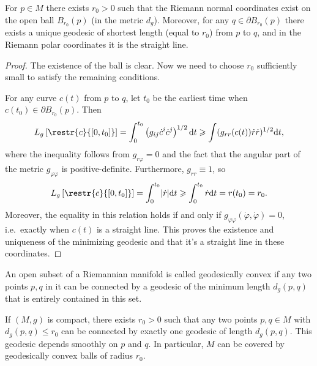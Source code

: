 \documentclass[english,letterpaper]{article}%
\numberwithin{equation}{section}
\numberwithin{figure}{section}
\numberwithin{table}{section}
\theoremstyle{definition}
\theoremstyle{definition}
\theoremstyle{definition}
\theoremstyle{plain}
\theoremstyle{plain}
\theoremstyle{plain}
\theoremstyle{plain}
\theoremstyle{remark}
\theoremstyle{remark}
\newcommand{\dd}{{\mathrm{d}}}
\renewcommand{\geq}{\geqslant}
\renewcommand{\leq}{\leqslant}
\begin{document}
\begin{cor}
    For $p\in M$ there exists $r_0>0$ such that the Riemann normal coordinates exist on the open ball $B_{r_0}(p)$ (in the metric $d_g$). Moreover, for any $q\in \partial B_{r_0}(p)$ there exists a unique geodesic of shortest length (equal to $r_0$) from $p$ to $q$, and in the Riemann polar coordinates it is the straight line.
\end{cor}
\begin{proof}
    The existence of the ball is clear. Now we need to choose $r_0$ sufficiently small to satisfy the remaining conditions.
    
    For any curve $c(t)$ from $p$ to $q$, let $t_0$ be the earliest time when $c(t_0)\in \partial B_{r_0}(p)$. Then
    \[L_g\left[\restr{c}{[0,t_0]}\right]=\int_0^{t_0} \left(g_{ij}\dot c^i\dot c^j\right)^{1/2}\dd t\geq \int (g_{rr}(c(t))\dot r\dot r)^{1/2}\dd t,\]
    where the inequality follows from $g_{r\varphi}=0$ and the fact that the angular part of the metric $g_{\varphi\varphi}$ is positive-definite. Furthermore, $g_{rr}\equiv1$, so
    \[L_g\left[\restr{c}{[0,t_0]}\right]=\int_0^{t_0}\lvert \dot r\rvert\dd t\geq \int_0^{t_0}\dot r\dd t=r(t_0)=r_0.\]
    Moreover, the equality in this relation holds if and only if $g_{\varphi\varphi}(\dot\varphi,\dot\varphi)=0$, i.e.\ exactly when $c(t)$ is a straight line. This proves the existence and uniqueness of the minimizing geodesic and that it's a straight line in these coordinates.
\end{proof}

\begin{defn}
    An open subset of a Riemannian manifold is called geodesically convex if any two points $p,q$ in it can be connected by a geodesic of the minimum length $d_g(p,q)$ that is entirely contained in this set.
\end{defn}

\begin{cor}
    If $(M,g)$ is compact, there exists $r_0>0$ such that any two points $p,q\in M$ with $d_g(p,q)\leq r_0$ can be connected by exactly one geodesic of length $d_g(p,q)$. This geodesic depends smoothly on $p$ and $q$. In particular, $M$ can be covered by geodesically convex balls of radius $r_0$.
\end{cor}
\end{document}
